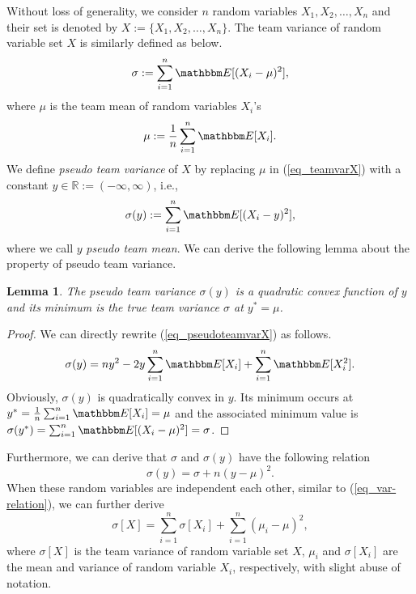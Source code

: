 \documentclass[12pt]{article}
\newtheorem{lemma}{Lemma}
\begin{document}
Without loss of generality, we consider $n$ random variables
$X_1,X_2,\dots,X_n$ and their set is denoted by
$X:=\{X_1,X_2,\dots,X_n\}$. The team variance of random variable set
$X$ is similarly defined as below.
\begin{equation}\label{eq_teamvarX}
\sigma := \sum_{i=1}^{n} \mathbbm E[(X_i - \mu)^2],
\end{equation}
where $\mu$ is the team mean of random variables $X_i$'s
\begin{equation}
\mu := \frac{1}{n}\sum_{i=1}^{n} \mathbbm E[X_i].
\end{equation}
We define \emph{pseudo team variance} of $X$ by replacing $\mu$ in
(\ref{eq_teamvarX}) with a constant $y \in \mathbb
R:=(-\infty,\infty)$, i.e.,
\begin{equation}\label{eq_pseudoteamvarX}
\sigma(y) := \sum_{i=1}^{n} \mathbbm E[(X_i - y)^2],
\end{equation}
where we call $y$ \emph{pseudo team mean}. We can derive the
following lemma about the property of pseudo team variance.
\begin{lemma}\label{lemma1}
The pseudo team variance $\sigma(y)$ is a quadratic convex function
of $y$ and its minimum is the true team variance $\sigma$ at $y^* =
\mu$.
\end{lemma}
\begin{proof}
We can directly rewrite (\ref{eq_pseudoteamvarX}) as follows.
\begin{eqnarray}
\sigma(y) = n y^2 - 2 y \sum_{i=1}^{n} \mathbbm E[X_i] +
\sum_{i=1}^{n} \mathbbm E[X_i^2].
\end{eqnarray}
Obviously, $\sigma(y)$ is quadratically convex in $y$. Its minimum
occurs at $y^* =  \frac{1}{n}\sum_{i=1}^{n} \mathbbm E[X_i] = \mu$
and the associated minimum value is $\sigma(y^*)=\sum_{i=1}^{n}
\mathbbm E[(X_i - \mu)^2]=\sigma$.
\end{proof}
Furthermore, we can derive that $\sigma$ and $\sigma(y)$ have the
following relation
\begin{equation}\label{eq11}
\sigma(y) = \sigma + n(y - \mu)^2.
\end{equation}
When these random variables are independent each other, similar to
(\ref{eq_var-relation}), we can further derive
\begin{equation}
\sigma[X] = \sum_{i=1}^{n}\sigma[X_i] + \sum_{i=1}^{n}(\mu_i -
\mu)^2,
\end{equation}
where $\sigma[X]$ is the team variance of random variable set $X$,
$\mu_i$ and $\sigma[X_i]$ are the mean and variance of random
variable $X_i$, respectively, with slight abuse of notation.
\end{document}
